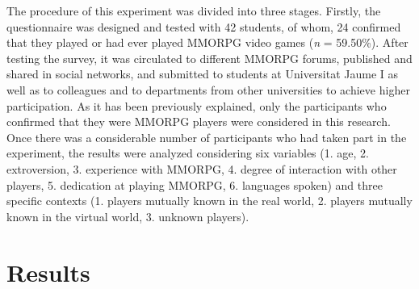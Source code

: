 \documentclass[english]{textolivre}
\begin{document}
The procedure of this experiment was divided into three stages. Firstly, the questionnaire was designed and tested with 42 students, of whom, 24 confirmed that they played or had ever played MMORPG video games (\emph{n} = 59.50\%). After testing the survey, it was circulated to different MMORPG forums, published and shared in social networks, and submitted to students at Universitat Jaume I as well as to colleagues and to departments from other universities to achieve higher participation. As it has been previously explained, only the participants who confirmed that they were MMORPG players were considered in this research. Once there was a considerable number of participants who had taken part in the experiment, the results were analyzed considering six variables (1. age, 2. extroversion, 3. experience with MMORPG, 4. degree of interaction with other players, 5. dedication at playing MMORPG, 6. languages spoken) and three specific contexts (1. players mutually known in the real world, 2. players mutually known in the virtual world, 3. unknown players). 

\section{Results}
\end{document}
